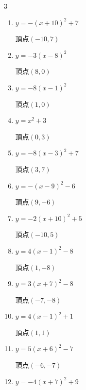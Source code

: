 \begin{multicols}{3}
\begin{enumerate}
  \item $\displaystyle y=-\left( x+10\right)^{2}+7$

        $\displaystyle 頂点\left( -10 , 7 \right)$

  \item $\displaystyle y=-3\left( x-8\right)^{2}$

        $\displaystyle 頂点\left( 8 , 0 \right)$

\columnbreak %

  \item $\displaystyle y=-8\left( x-1\right)^{2}$

        $\displaystyle 頂点\left( 1 , 0 \right)$

  \item $\displaystyle y=x^{2}+3$

        $\displaystyle 頂点\left( 0 , 3 \right)$

  \item $\displaystyle y=-8\left( x-3\right)^{2}+7$

        $\displaystyle 頂点\left( 3 , 7 \right)$

  \item $\displaystyle y=-\left( x-9\right)^{2}-6$

        $\displaystyle 頂点\left( 9 , -6 \right)$

  \item $\displaystyle y=-2\left( x+10\right)^{2}+5$

        $\displaystyle 頂点\left( -10 , 5 \right)$

  \item $\displaystyle y=4\left( x-1\right)^{2}-8$

        $\displaystyle 頂点\left( 1 , -8 \right)$

  \item $\displaystyle y=3\left( x+7\right)^{2}-8$

        $\displaystyle 頂点\left( -7 , -8 \right)$

  \item $\displaystyle y=4\left( x-1\right)^{2}+1$

        $\displaystyle 頂点\left( 1 , 1 \right)$

  \item $\displaystyle y=5\left( x+6\right)^{2}-7$

        $\displaystyle 頂点\left( -6 , -7 \right)$

  \item $\displaystyle y=-4\left( x+7\right)^{2}+9$


\end{enumerate}
\end{multicols}
